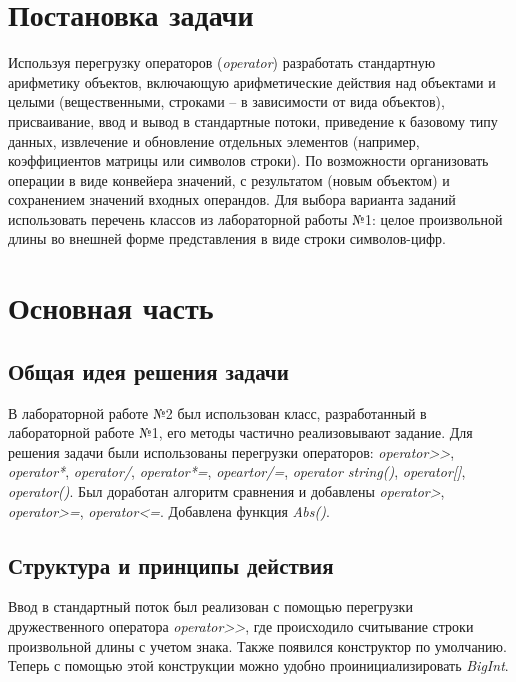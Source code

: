 \documentclass[a4paper,14pt]{article}
\begin{document}

\setcounter{page}{2} %

\renewcommand\contentsname{\centering {\normalsize Содержание}}
\tableofcontents
\newpage

\section*{Постановка задачи}

Используя перегрузку операторов (\textit{operator}) разработать стандартную арифметику объектов, включающую арифметические действия над объектами и целыми (вещественными, строками – в зависимости от
вида объектов), присваивание, ввод и вывод в стандартные потоки, приведение к базовому типу данных, извлечение и обновление отдельных элементов (например, коэффициентов матрицы или символов строки). По возможности организовать операции в виде конвейера значений, с результатом (новым объектом) и сохранением значений входных операндов. Для выбора варианта заданий использовать перечень классов из лабораторной работы №1: целое произвольной длины во внешней форме представления в виде строки символов-цифр.

\newpage

\section{Основная часть}
\subsection{Общая идея решения задачи}
В лабораторной работе №2 был использован класс, разработанный в лабораторной работе №1, его методы частично реализовывают задание.
Для решения задачи были использованы перегрузки операторов: \textit{operator>>}, \textit{operator*}, \textit{operator/}, \textit{operator*=}, \textit{opeartor/=}, \textit{operator string()}, \textit{operator[]}, \textit{operator()}.
Был доработан алгоритм сравнения и добавлены \textit{operator>}, \textit{operator>=}, \textit{operator<=}. Добавлена функция \textit{Abs()}.
\subsection{Структура и принципы действия}
Ввод в стандартный поток был реализован с помощью перегрузки дружественного оператора \textit{operator>>}, где происходило считывание строки произвольной длины с учетом знака. Также появился конструктор по умолчанию. Теперь с помощью этой конструкции можно удобно проинициализировать \textit{BigInt}.
\end{document}
